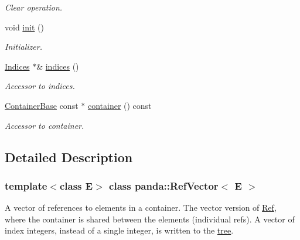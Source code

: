 \begin{DoxyCompactItemize}
\begin{DoxyCompactList}\small\item\em Clear operation. \item\end{DoxyCompactList}\item 
void \hyperlink{classpanda_1_1RefVector_adf498e038158f31128bb0efb399041cd}{init} ()
\begin{DoxyCompactList}\small\item\em Initializer. \item\end{DoxyCompactList}\item 
\hyperlink{classpanda_1_1RefVector_a062e47758de4bd1c58242267d4aabef8}{Indices} $\ast$\& \hyperlink{classpanda_1_1RefVector_a50a990104f945e9c2981e681083dc95f}{indices} ()
\begin{DoxyCompactList}\small\item\em Accessor to indices. \item\end{DoxyCompactList}\item 
\hyperlink{classpanda_1_1ContainerBase}{ContainerBase} const $\ast$ \hyperlink{classpanda_1_1RefVector_aa256cff6aa9fc74451ebf1575c63c0a4}{container} () const 
\begin{DoxyCompactList}\small\item\em Accessor to container. \item\end{DoxyCompactList}\end{DoxyCompactItemize}


\subsection{Detailed Description}
\subsubsection*{template$<$class E$>$ class panda::RefVector$<$ E $>$}

A vector of references to elements in a container. The vector version of \hyperlink{classpanda_1_1Ref}{Ref}, where the container is shared between the elements (individual refs). A vector of index integers, instead of a single integer, is written to the \hyperlink{namespacepanda_1_1tree}{tree}. 

